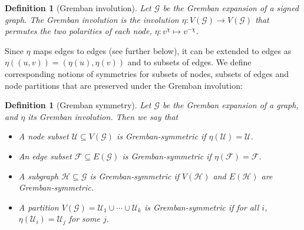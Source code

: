\documentclass[reprint,onecolumn]{article}
\newtheorem{definition}[theorem]{Definition}  %
\newcommand{\1}{\mathbb{1}}
\newcommand{\0}{\mathbf{0}}
\begin{document}
\begin{definition}[Gremban involution]\label{def:gremban_symmetry}
Let $\mathcal{G}$ be the Gremban expansion of a signed graph. The \emph{Gremban involution} is the involution $\eta:V(\mathcal{G})\rightarrow V(\mathcal{G})$ that permutes the two polarities of each node, $\eta:v^\chi\mapsto v^{-\chi}$.
\end{definition}
Since $\eta$ maps edges to edges (see further below), it can be extended to edges as $\eta((u,v))=(\eta(u),\eta(v))$ and to subsets of edges. We define corresponding notions of symmetries for subsets of nodes, subsets of edges and node partitions that are preserved under the Gremban involution:
\begin{definition}[Gremban symmetry]
Let $\mathcal{G}$ be the Gremban expansion of a graph, and $\eta$ its Gremban involution. Then we say that
\begin{itemize}
    \item A node subset $\mathcal{U}\subseteq V(\mathcal{G})$ is \emph{Gremban-symmetric} if $\eta(\mathcal{U})=\mathcal{U}$.
    
    \item An edge subset $\mathcal{F}\subseteq E(\mathcal{G})$ is \emph{Gremban-symmetric} if $\eta(\mathcal{F})=\mathcal{F}$.

    \item A subgraph $\mathcal{H}\subseteq\mathcal{G}$ is \emph{Gremban-symmetric} if $V(\mathcal{H})$ and $E(\mathcal{H})$ are Gremban-symmetric.

    \item A partition $V(\mathcal{G})=\mathcal{U}_1\cup\cdots\cup\mathcal{U}_k$ is \emph{Gremban-symmetric} if for all $i$, $\eta(\mathcal{U}_i)=\mathcal{U}_j$ for some $j$.
\end{itemize}
\end{definition}
\end{document}
